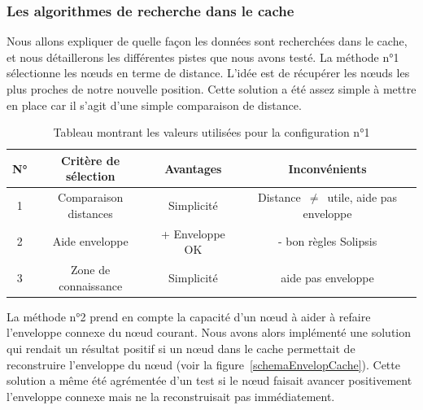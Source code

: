 \subsubsection{Les algorithmes de recherche dans le cache}
\par Nous allons expliquer de quelle façon les données sont recherchées dans le cache, et nous détaillerons les différentes pistes que nous avons testé. La méthode n°1 sélectionne les nœuds en terme de distance. L'idée est de récupérer les nœuds les plus proches de notre nouvelle position. Cette solution a été assez simple à mettre en place car il s'agit d'une simple comparaison de distance. 
\begin{table}[!h]
  \begin{center}
    \begin{tabular}{|c|c|c|c|}
      \hline
      N° & Critère de sélection & Avantages & Inconvénients\\
      \hline
      	1 & Comparaison distances & Simplicité & Distance~$\ne$~utile, aide pas enveloppe\\
      	2 & Aide enveloppe & + Enveloppe OK & - bon règles Solipsis\\
      	3 & Zone de connaissance & Simplicité & aide pas enveloppe\\
      \hline
    \end{tabular}
  \end{center}
  \label{tab:config1}
  \caption{Tableau montrant les valeurs utilisées pour la configuration n°1}
\end{table}


\par La méthode n°2 prend en compte la capacité d'un nœud à aider à refaire l'enveloppe connexe du nœud courant. Nous avons alors implémenté une solution qui rendait un résultat positif si un nœud dans le cache permettait de reconstruire l'enveloppe du nœud (voir la figure~\ref{schemaEnvelopCache}). Cette solution a même été agrémentée d'un test si le nœud faisait avancer positivement l'enveloppe connexe mais ne la reconstruisait pas immédiatement.

